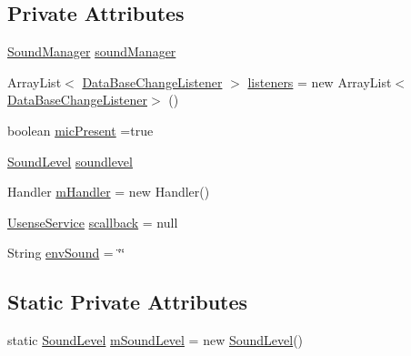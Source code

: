 \subsection*{Private Attributes}
\begin{DoxyCompactItemize}
\item 
\hyperlink{classcs_1_1usense_1_1microphone_1_1_sound_manager}{Sound\+Manager} \hyperlink{classcs_1_1usense_1_1microphone_1_1_microphone_pipeline_a25e3b63425e7205555b7db7a0ad21781}{sound\+Manager}
\item 
Array\+List$<$ \hyperlink{interfacecs_1_1usense_1_1db_1_1_data_base_change_listener}{Data\+Base\+Change\+Listener} $>$ \hyperlink{classcs_1_1usense_1_1microphone_1_1_microphone_pipeline_a1eff9feda79cd4a08ee49bb467f15ecc}{listeners} = new Array\+List$<$\hyperlink{interfacecs_1_1usense_1_1db_1_1_data_base_change_listener}{Data\+Base\+Change\+Listener}$>$ ()
\item 
boolean \hyperlink{classcs_1_1usense_1_1microphone_1_1_microphone_pipeline_ae8bb2c4509baf886e1ff2e77bae8356b}{mic\+Present} =true
\item 
\hyperlink{classcs_1_1usense_1_1microphone_1_1_sound_level}{Sound\+Level} \hyperlink{classcs_1_1usense_1_1microphone_1_1_microphone_pipeline_ac5246bcde0eda6ad83d282e324ba0a2a}{soundlevel}
\item 
Handler \hyperlink{classcs_1_1usense_1_1microphone_1_1_microphone_pipeline_ab5a06361be8e86012bd686131f9aa369}{m\+Handler} = new Handler()
\item 
\hyperlink{classcs_1_1usense_1_1_usense_service}{Usense\+Service} \hyperlink{classcs_1_1usense_1_1microphone_1_1_microphone_pipeline_aa056fc73463dc36055dca68894c93a07}{scallback} = null
\item 
String \hyperlink{classcs_1_1usense_1_1microphone_1_1_microphone_pipeline_a9cf0bbbfbf30ee96be5d83c446f5396b}{env\+Sound} = \char`\"{}\char`\"{}
\end{DoxyCompactItemize}
\subsection*{Static Private Attributes}
\begin{DoxyCompactItemize}
\item 
static \hyperlink{classcs_1_1usense_1_1microphone_1_1_sound_level}{Sound\+Level} \hyperlink{classcs_1_1usense_1_1microphone_1_1_microphone_pipeline_a3d812b7a892cd2752f523ad2a3fe40dc}{m\+Sound\+Level} = new \hyperlink{classcs_1_1usense_1_1microphone_1_1_sound_level}{Sound\+Level}()
\end{DoxyCompactItemize}


